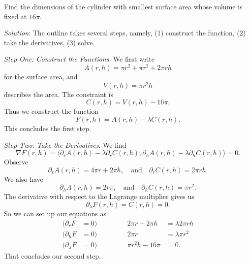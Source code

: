 \begin{example}
Find the dimensions of the cylinder with smallest surface area
whose volume is fixed at $16\pi$.

\emph{Solution}: The outline takes several steps, namely, (1)
construct the function, (2) take the derivatives, (3) solve.

\emph{Step One: Construct the Functions}. We first write
\begin{equation}
A(r,h) = \pi r^{2} + \pi r^{2} + 2\pi rh
\end{equation}
for the surface area, and
\begin{equation}
V(r,h) = \pi r^{2}h
\end{equation}
describes the area. The constraint is
\begin{equation}
C(r,h) = V(r,h) - 16\pi.
\end{equation}
Thus we construct the function
\begin{equation}
F(r,h) = A(r,h) - \lambda C(r,h).
\end{equation}
This concludes the first step.

\emph{Step Two: Take the Derivatives}. We find
\begin{equation}
\nabla F(r,h) = \langle \partial_{r}A(r,h)
- \lambda\partial_{r}C(r,h), \partial_{h}A(r,h)-\lambda\partial_{h}C(r,h)\rangle
  = 0.
\end{equation}
Observe
\begin{equation}
\partial_{r}A(r,h)=4\pi r+2\pi h,\quad\mbox{and}\quad
\partial_{r}C(r,h)=2\pi rh.
\end{equation}
We also have
\begin{equation}
\partial_{h}A(r,h)=2r\pi,\quad\mbox{and}\quad
\partial_{h}C(r,h)=\pi r^{2}.
\end{equation}
The derivative with respect to the Lagrange multiplier gives us
\begin{equation}
\partial_{\lambda}F(r,h) = C(r,h) = 0.
\end{equation}
So we can set up our equations as
\begin{equation}
\begin{aligned}
(\partial_{r}F&=0)&\quad &\quad &2\pi r+2\pi h&=\lambda 2\pi rh\\
(\partial_{h}F&=0)&\quad &\quad &2\pi r &=\lambda\pi r^{2}\\
(\partial_{\lambda}F&=0)&\quad &\quad &\pi r^{2}h-16\pi&=0.
\end{aligned}
\end{equation}
That concludes our second step.


\end{example}
